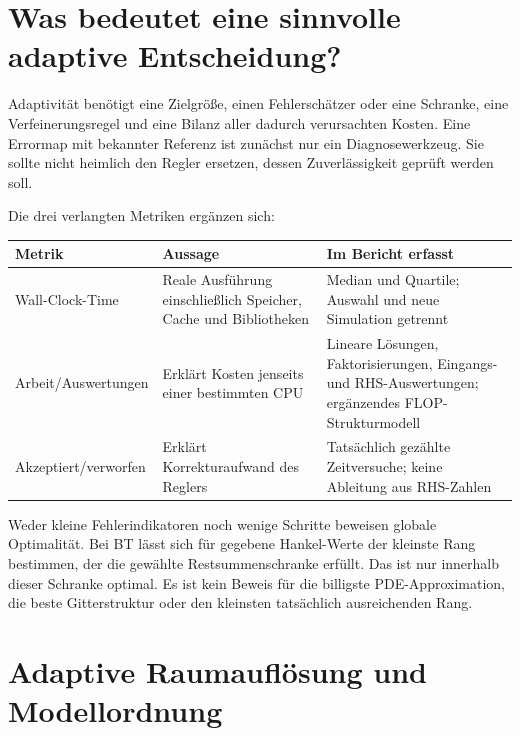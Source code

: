 \section{Was bedeutet eine sinnvolle adaptive Entscheidung?}
Adaptivität benötigt eine Zielgröße, einen Fehlerschätzer oder eine Schranke, eine Verfeinerungsregel und eine Bilanz aller dadurch verursachten Kosten. Eine Errormap mit bekannter Referenz ist zunächst nur ein Diagnosewerkzeug. Sie sollte nicht heimlich den Regler ersetzen, dessen Zuverlässigkeit geprüft werden soll.

Die drei verlangten Metriken ergänzen sich:
\begin{table}[htbp]\centering\small
\begin{tabularx}{\linewidth}{>{\raggedright\arraybackslash}p{36mm}>{\raggedright\arraybackslash}X>{\raggedright\arraybackslash}X}\toprule
Metrik & Aussage & Im Bericht erfasst\\\midrule
Wall-Clock-Time & Reale Ausführung einschließlich Speicher, Cache und Bibliotheken & Median und Quartile; Auswahl und neue Simulation getrennt\\
Arbeit/Auswertungen & Erklärt Kosten jenseits einer bestimmten CPU & Lineare Lösungen, Faktorisierungen, Eingangs- und RHS-Auswertungen; ergänzendes FLOP-Strukturmodell\\
Akzeptiert/verworfen & Erklärt Korrekturaufwand des Reglers & Tatsächlich gezählte Zeitversuche; keine Ableitung aus RHS-Zahlen\\\bottomrule
\end{tabularx}
\end{table}

Weder kleine Fehlerindikatoren noch wenige Schritte beweisen globale Optimalität. Bei BT lässt sich für gegebene Hankel-Werte der kleinste Rang bestimmen, der die gewählte Restsummenschranke erfüllt. Das ist nur innerhalb dieser Schranke optimal. Es ist kein Beweis für die billigste PDE-Approximation, die beste Gitterstruktur oder den kleinsten tatsächlich ausreichenden Rang.

\section{Adaptive Raumauflösung und Modellordnung}
